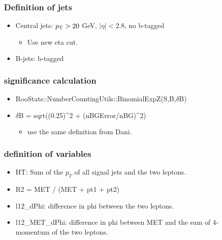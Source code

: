 \documentclass[mathserif,serif]{beamer}
\begin{document}
\begin{frame}
\frametitle{Definition of jets}
\normalsize
\begin{itemize}
\item Central jets: $p_{\text{T}}>20$ GeV, $|\eta|<2.8$, no b-tagged
\begin{itemize}
\item Use new eta cut.
\end{itemize}
\item B-jets: b-tagged
\end{itemize}
\end{frame}

\begin{frame}
\frametitle{significance calculation}
\begin{itemize}
\item RooStats::NumberCountingUtils::BinomialExpZ(S,B,$\delta$B)
\item $\delta$B = sqrt((0.25)\^{}2 + (nBGError/nBG)\^{}2)
\begin{itemize}
\item use the same definition from Dani.
\end{itemize}
\end{itemize}
\end{frame}

\begin{frame}
\frametitle{definition of variables}
\normalsize
\begin{itemize}
\item HT: Sum of the $p_T$ of all signal jets and the two leptons.
\item R2 = MET / (MET + pt1 + pt2)
\item l12\_dPhi: difference in phi between the two leptons.
\item l12\_MET\_dPhi: difference in phi between MET and the sum of 4-momentum of the two leptons.
\end{itemize}
\end{frame}
\end{document}
